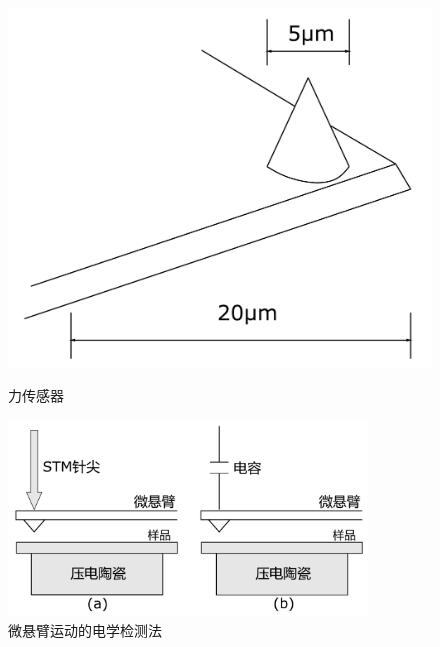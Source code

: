 \documentclass[a4paper]{article}
\begin{document}
\begin{figure}[!h]
\begin{minipage}{0.29\textwidth}
\begin{center}
\includegraphics[width=1.2\textwidth]{fig/fig1.pdf}
\caption{力传感器}\label{fig1}
\end{center}
\end{minipage}
\begin{minipage}{0.69\textwidth}
\begin{center}
\includegraphics[width=0.85\textwidth]{fig/fig2.pdf}
\caption{微悬臂运动的电学检测法}\label{fig2}
\end{center}
\end{minipage}
\end{figure}
\end{document}
